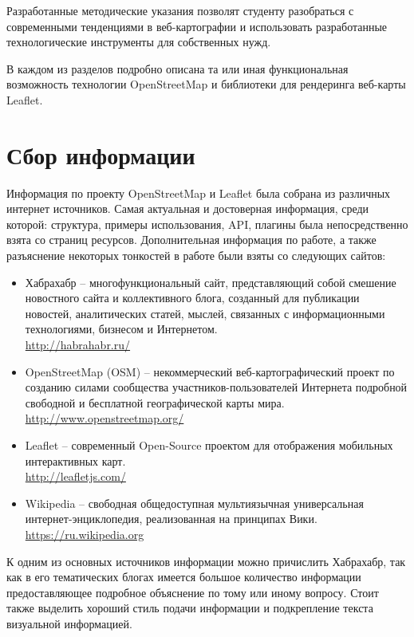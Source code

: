 \documentclass[a4paper, 14pt]{extreport}
\begin{document}
    Разработанные методические указания позволят студенту разобраться с
    современными тенденциями в веб-картографии и использовать разработанные
    технологические инструменты для собственных нужд.  

    В каждом из разделов подробно описана та или иная функциональная
    возможность технологии OpenStreetMap и библиотеки для рендеринга веб-карты
    Leaflet.

    \chapter{Сбор информации}
    Информация по проекту OpenStreetMap и Leaflet была собрана из различных
    интернет источников. Самая актуальная и достоверная информация, среди
    которой: структура, примеры использования, API, плагины была
    непосредственно взята со страниц ресурсов. Дополнительная информация по
    работе, а также разъяснение некоторых тонкостей в работе были взяты со
    следующих сайтов:
    \begin{itemize}
        \item Хабрахабр -- многофункциональный сайт, представляющий собой
            смешение новостного сайта и коллективного блога, созданный для
            публикации новостей, аналитических статей, мыслей, связанных с
            информационными технологиями, бизнесом и Интернетом.\\
            \url{http://habrahabr.ru/}
        \item OpenStreetMap (OSM) -- некоммерческий веб-картографический проект
            по созданию силами сообщества участников-пользователей Интернета
            подробной свободной и бесплатной географической карты мира.\\
            \url{http://www.openstreetmap.org/}
        \item Leaflet -- современный Open-Source проектом для отображения
            мобильных интерактивных карт.\\
            \url{http://leafletjs.com/}
        \item Wikipedia -- свободная общедоступная мультиязычная
            универсальная \\интернет-энциклопедия, реализованная на принципах
            Вики.\\
            \url{https://ru.wikipedia.org}
    \end{itemize}
    
    К одним из основных источников информации можно причислить Хабрахабр, так
    как в его тематических блогах имеется большое количество информации
    предоставляющее подробное объяснение по тому или иному вопросу. Стоит также
    выделить хороший стиль подачи информации и подкрепление текста визуальной
    информацией.
\end{document}

